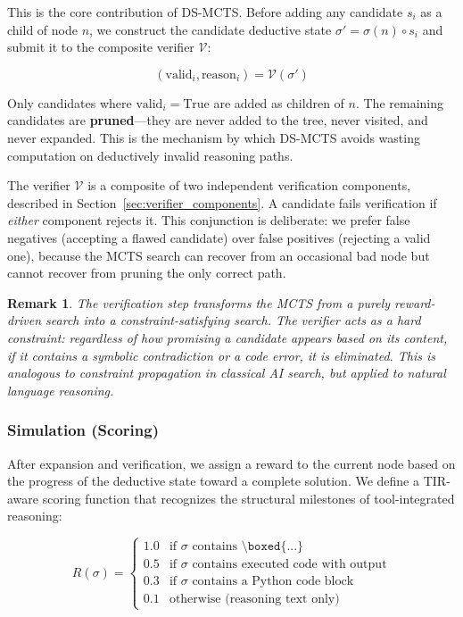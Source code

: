 \documentclass[11pt,a4paper]{article}
\newtheorem{remark}{Remark}
\begin{document}
This is the core contribution of DS-MCTS. Before adding any candidate $s_i$
as a child of node $n$, we construct the candidate deductive state
$\sigma' = \sigma(n) \circ s_i$ and submit it to the composite verifier
$\mathcal{V}$:

\begin{equation}
(\text{valid}_i, \text{reason}_i) = \mathcal{V}(\sigma')
\end{equation}

Only candidates where $\text{valid}_i = \text{True}$ are added as children of
$n$. The remaining candidates are \textbf{pruned}---they are never added to the
tree, never visited, and never expanded. This is the mechanism by which DS-MCTS
avoids wasting computation on deductively invalid reasoning paths.

The verifier $\mathcal{V}$ is a composite of two independent verification
components, described in Section~\ref{sec:verifier_components}. A candidate
fails verification if \emph{either} component rejects it. This conjunction is
deliberate: we prefer false negatives (accepting a flawed candidate) over false
positives (rejecting a valid one), because the MCTS search can recover from an
occasional bad node but cannot recover from pruning the only correct path.

\begin{remark}
The verification step transforms the MCTS from a purely reward-driven search
into a \emph{constraint-satisfying} search. The verifier acts as a hard
constraint: regardless of how promising a candidate appears based on its
content, if it contains a symbolic contradiction or a code error, it is
eliminated. This is analogous to constraint propagation in classical AI
search, but applied to natural language reasoning.
\end{remark}

\subsubsection{Simulation (Scoring)}

After expansion and verification, we assign a reward to the current node based
on the progress of the deductive state toward a complete solution. We define a
TIR-aware scoring function that recognizes the structural milestones of
tool-integrated reasoning:

\begin{equation}
R(\sigma) = \begin{cases}
1.0 & \text{if } \sigma \text{ contains } \texttt{\textbackslash boxed\{...\}} \\
0.5 & \text{if } \sigma \text{ contains executed code with output} \\
0.3 & \text{if } \sigma \text{ contains a Python code block} \\
0.1 & \text{otherwise (reasoning text only)}
\end{cases}
\label{eq:reward}
\end{equation}
\end{document}
